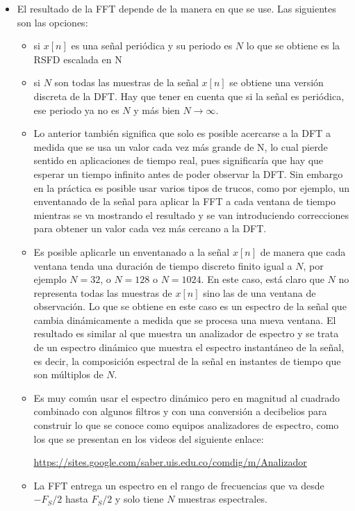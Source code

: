 \begin{itemize}
     \item El resultado de la FFT depende de la manera en que se use. Las siguientes son las opciones:
     \begin{itemize}
         \item si $x[n]$ es una señal periódica y su periodo es $N$ lo que se obtiene es la RSFD escalada en N
         \item si $N$ son todas las muestras de la señal $x[n]$ se obtiene una versión discreta de la DFT. Hay que tener en cuenta que si la señal es periódica, ese periodo ya no es $N$ y más bien $N \to \infty$. 
         \item Lo anterior también significa que solo es posible acercarse a la DFT a medida que se usa un valor cada vez más grande de N, lo cual pierde sentido en aplicaciones de tiempo real, pues significaría que hay que esperar un tiempo infinito antes de poder observar la DFT. Sin embargo en la práctica es posible usar varios tipos de trucos, como por ejemplo, un enventanado de la señal para aplicar la FFT a cada ventana de tiempo mientras se va mostrando el resultado y se van introduciendo correcciones para obtener un valor cada vez más cercano a la DFT.
         \item Es posible aplicarle un enventanado a la señal $x[n]$ de manera que cada ventana tenda una duración de tiempo discreto finito igual a $N$, por ejemplo $N=32$, o $N=128$ o $N=1024$. En este caso, está claro que $N$ no representa todas las muestras de $x[n]$ sino las de una ventana de observación. Lo que se obtiene en este caso es un espectro de la señal que cambia dinámicamente a medida que se procesa una nueva ventana. El resultado es similar al que muestra un analizador de espectro y se trata de un espectro dinámico que muestra el espectro instantáneo de la señal, es decir, la composición espectral de la señal en instantes de tiempo que son múltiplos de $N$. 
         \item Es muy común usar el espectro dinámico pero en magnitud al cuadrado combinado con algunos filtros y con una conversión a decibelios para construir lo que se conoce como equipos analizadores de espectro, como los que se presentan en los videos del siguiente enlace:
         \begin{center}
          \url{https://sites.google.com/saber.uis.edu.co/comdig/m/Analizador} 
         \end{center}
         \item La FFT entrega un espectro en el rango de frecuencias que va desde $-F_S/2$ hasta $F_S/2$ y solo tiene $N$ muestras espectrales.

\end{itemize}
\end{itemize}
